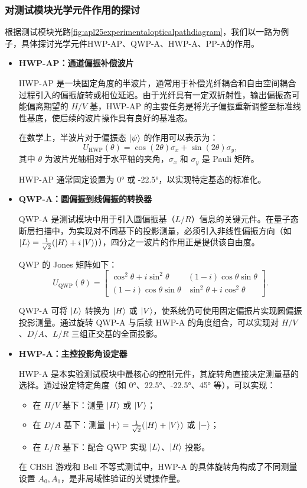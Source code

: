 \subsubsection{对测试模块光学元件作用的探讨}
根据测试模块光路\cref{fig:apl25experimentalopticalpathdiagram}，我们以一路为例子，具体探讨光学元件HWP-AP、QWP-A、HWP-A、PP-A的作用。
\begin{itemize}
	\item \textbf{HWP-AP：通道偏振补偿波片}
	
	HWP-AP 是一块固定角度的半波片，通常用于补偿光纤耦合和自由空间耦合过程引入的偏振旋转或相位延迟。由于光纤具有一定双折射性，输出偏振态可能偏离期望的 $H/V$ 基，HWP-AP 的主要任务是将光子偏振重新调整至标准线性基底，使后续的波片操作具有良好的基准态。
	
	在数学上，半波片对于偏振态 $\ket{\psi}$ 的作用可以表示为：
	\[
	U_{\text{HWP}}(\theta) = \cos(2\theta) \sigma_x + \sin(2\theta) \sigma_y,
	\]
	其中 $\theta$ 为波片光轴相对于水平轴的夹角，$\sigma_x$ 和 $\sigma_y$ 是 Pauli 矩阵。
	
	HWP-AP 通常固定设置为 0° 或 -22.5°，以实现特定基态的标准化。
	
	\item \textbf{QWP-A：圆偏振到线偏振的转换器}
	
	QWP-A 是测试模块中用于引入圆偏振基（$L/R$）信息的关键元件。在量子态断层扫描中，为实现对不同基下的投影测量，必须引入非线性偏振方向（如 $\ket{L} = \frac{1}{\sqrt{2}}(\ket{H} + i\ket{V})$），四分之一波片的作用正是提供该自由度。
	
	QWP 的 Jones 矩阵如下：
	\[
	U_{\text{QWP}}(\theta) = \begin{bmatrix}
		\cos^2\theta + i\sin^2\theta & (1 - i)\cos\theta\sin\theta \\
		(1 - i)\cos\theta\sin\theta & \sin^2\theta + i\cos^2\theta
	\end{bmatrix}.
	\]
	
	QWP-A 可将 $\ket{L}$ 转换为 $\ket{H}$ 或 $\ket{V}$，使系统仍可使用固定偏振片实现圆偏振投影测量。通过旋转 QWP-A 与后续 HWP-A 的角度组合，可以实现对 $H/V$、$D/A$、$L/R$ 三组正交基的全面投影。
	
	\item \textbf{HWP-A：主控投影角设定器}
	
	HWP-A 是本实验测试模块中最核心的控制元件，其旋转角直接决定测量基的选择。通过设定特定角度（如 0°、22.5°、-22.5°、45° 等），可以实现：
	\begin{itemize}
		\item 在 $H/V$ 基下：测量 $\ket{H}$ 或 $\ket{V}$；
		\item 在 $D/A$ 基下：测量 $\ket{+} = \frac{1}{\sqrt{2}}(\ket{H} + \ket{V})$ 或 $\ket{-}$；
		\item 在 $L/R$ 基下：配合 QWP 实现 $\ket{L}$、$\ket{R}$ 投影。
	\end{itemize}
	在 CHSH 游戏和 Bell 不等式测试中，HWP-A 的具体旋转角构成了不同测量设置 $A_0, A_1$，是非局域性验证的关键操作量。
	

\end{itemize}
